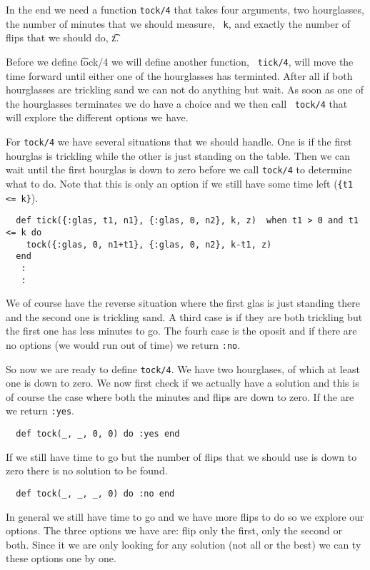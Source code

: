 \documentclass[a4paper,11pt]{article}
\begin{document}
In the end we need a function {\tt tock/4} that takes four arguments,
two hourglasses, the number of minutes that we should measure, {\tt
  k}, and exactly the number of flips that we should do, {\t z}.

Before we define {\t tock/4} we will define another function, {\tt
  tick/4}, will move the time forward until either one of the
hourglasses has terminted. After all if both hourglasses are trickling
sand we can not do anything but wait. As soon as one of the
hourglasses terminates we do have a choice and we then call {\tt
  tock/4} that will explore the different options we have.

For {\tt tock/4} we have several situations that we should handle.
One is if the first hourglas is trickling while the other is just
standing on the table. Then we can wait until the first hourglas is
down to zero before we call {\tt tock/4} to determine what to do. Note
that this is only an option if we still have some time left ({\tt \{t1
  <= k\}}).

\begin{verbatim}
  def tick({:glas, t1, n1}, {:glas, 0, n2}, k, z)  when t1 > 0 and t1 <= k do  
    tock({:glas, 0, n1+t1}, {:glas, 0, n2}, k-t1, z)
  end
   :
   :
\end{verbatim}

We of course have the reverse situation where the first glas is just
standing there and the second one is trickling sand. A third case is
if they are both trickling but the first one has less minutes to
go. The fourh case is the oposit and if there are no options (we would
run out of time) we return {\tt :no}.

So now we are ready to define {\tt tock/4}. We have two hourglases, of
which at least one is down to zero. We now first check if we actually
have a solution and this is of course the case where both the minutes
and flips are down to zero. If the are we return {\tt :yes}.

\begin{verbatim}
  def tock(_, _, 0, 0) do :yes end
\end{verbatim}

If we still have time to go but the number of flips that we should use
is down to zero there is no solution to be found.

\begin{verbatim}
  def tock(_, _, _, 0) do :no end  
\end{verbatim}

In general we still have time to go and we have more flips to do so we
explore our options. The three options we have are: flip only the
first, only the second or both. Since it we are only looking for any
solution (not all or the best) we can ty these options one by one. 
\end{document}
